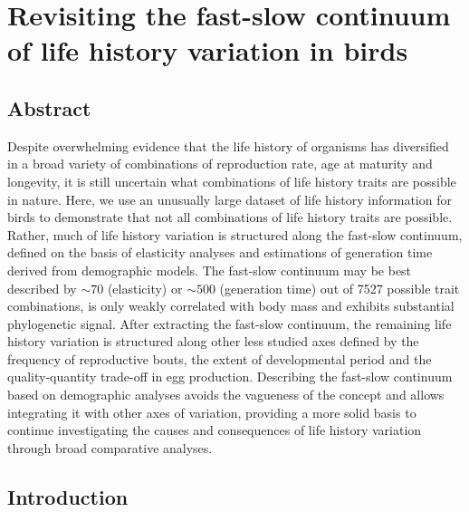 \chapter[Axes of life history variation]{Revisiting the fast-slow continuum of 
life history variation in birds}\label{ch:LHaxes}


\section*{Abstract}

Despite overwhelming evidence that the life history of organisms has diversified
in a broad variety of combinations of reproduction rate, age at maturity and
longevity, it is still uncertain what combinations of life history traits are
possible in nature. Here, we use an unusually large dataset of life history
information for birds to demonstrate that not all combinations of life history
traits are possible. Rather, much of life history variation is structured along
the fast-slow continuum, defined on the basis of elasticity analyses and
estimations of generation time derived from demographic models. The fast-slow
continuum may be best described by $\sim70$ (elasticity) or $\sim500$
(generation time) out of 7527 possible trait combinations, is only weakly
correlated with body mass and exhibits substantial phylogenetic signal. After
extracting the fast-slow continuum, the remaining life history variation is
structured along other less studied axes defined by the frequency of
reproductive bouts, the extent of developmental period and the quality-quantity
trade-off in egg production. Describing the fast-slow continuum based on
demographic analyses avoids the vagueness of the concept and allows integrating
it with other axes of variation, providing a more solid basis to continue
investigating the causes and consequences of life history variation through
broad comparative analyses.


\section{Introduction}


